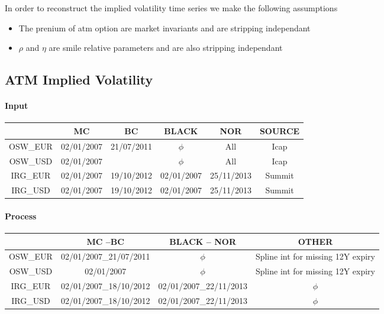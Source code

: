 \documentclass[3pt]{article}
\begin{document}
In order to reconstruct the implied volatility time series we make the
following assumptions

\begin{itemize}
\item The prenium of atm option are market invariants and are stripping
independant

\item $\rho $ and $\eta $ are smile relative parameters and are also
stripping independant
\end{itemize}

\subsection{ATM Implied Volatility}

\paragraph{Input}

\bigskip 
\begin{tabular}{c|c|c|c|c|c|}
\cline{2-6}
& MC & BC & BLACK & NOR & SOURCE \\ \hline
\multicolumn{1}{|c|}{OSW\_EUR} & 02/01/2007 & 21/07/2011 & $\phi $ & All & 
Icap \\ \hline
\multicolumn{1}{|c|}{OSW\_USD} & 02/01/2007 &  & $\phi $ & All & Icap \\ 
\hline
\multicolumn{1}{|c|}{IRG\_EUR} & 02/01/2007 & 19/10/2012 & 02/01/2007 & 
25/11/2013 & Summit \\ \hline
\multicolumn{1}{|c|}{IRG\_USD} & 02/01/2007 & 19/10/2012 & 02/01/2007 & 
25/11/2013 & Summit \\ \hline
\end{tabular}

\paragraph{Process}

\bigskip

\bigskip 
\begin{tabular}{c|c|c|c|}
\cline{2-4}
& MC --\TEXTsymbol{>}BC & BLACK --\TEXTsymbol{>} NOR & OTHER \\ \hline
\multicolumn{1}{|c|}{OSW\_EUR} & 02/01/2007\_21/07/2011 & $\phi $ & Spline
int for missing 12Y expiry \\ \hline
\multicolumn{1}{|c|}{OSW\_USD} & 02/01/2007 & $\phi $ & Spline int for
missing 12Y expiry \\ \hline
\multicolumn{1}{|c|}{IRG\_EUR} & 02/01/2007\_18/10/2012 & 
02/01/2007\_22/11/2013 & $\phi $ \\ \hline
\multicolumn{1}{|c|}{IRG\_USD} & 02/01/2007\_18/10/2012 & 
02/01/2007\_22/11/2013 & $\phi $ \\ \hline
\end{tabular}
\end{document}
